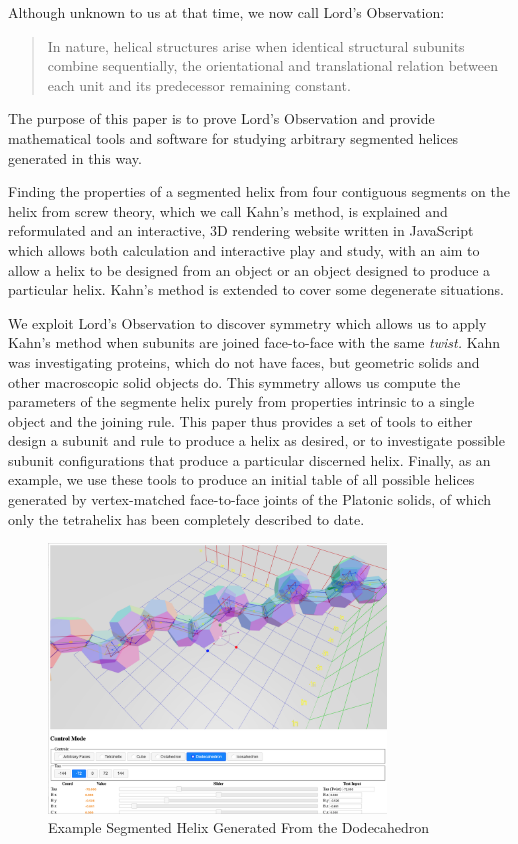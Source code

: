 \documentclass[11pt]{article}
\begin{document}
{Although unknown to us at that time, we now call Lord's Observation:
\begin{quote}
  In nature, helical structures arise when identical structural subunits combine sequentially, the orientational and translational relation between each unit
  and its predecessor remaining constant.\cite{lord2002helical}
\end{quote}
The purpose of this paper is to prove Lord's Observation and provide mathematical tools and software for studying arbitrary
segmented helices generated in this way.

Finding the properties of a segmented helix from four contiguous segments on the helix from screw theory\cite{abbasi2015review,wittenburg2016kinematics,wiki:screwaxis}, which we call Kahn's method\cite{kahn1989defining},
is explained and reformulated and an interactive, 3D rendering website written in JavaScript which allows both calculation and
interactive play and study, with an aim to allow a helix to be designed from an object or an object designed to produce a particular helix.
Kahn's method is extended to cover some degenerate situations.

We exploit Lord's Observation to discover symmetry which allows us to apply Kahn's method when subunits are joined face-to-face with
the same {\em twist.} Kahn was investigating proteins, which do not have faces, but geometric solids and other macroscopic solid objects do.
This symmetry allows us compute the parameters of the segmente helix purely from
properties intrinsic to a single object and the joining rule.
This paper thus provides a set of tools to either design a subunit and rule to produce a helix as desired, or to investigate
possible subunit configurations that produce a particular discerned helix.
Finally, as an example, we use these tools to produce an initial table of all possible helices generated by vertex-matched face-to-face joints of the
Platonic solids, of which only the tetrahelix\cite{coxeter1985simplicial,sadler2013periodic,fuller1982synergetics,read2018transforming,pearce1990structure}
has been completely described to date.

\begin{figure}
     \centering
     \includegraphics[width=0.80\textwidth]{figures/Dodecahedral.png}
     \caption{Example Segmented Helix Generated From the Dodecahedron}
  \label{fig:dodecahedron}
\end{figure}


}
\end{document}

